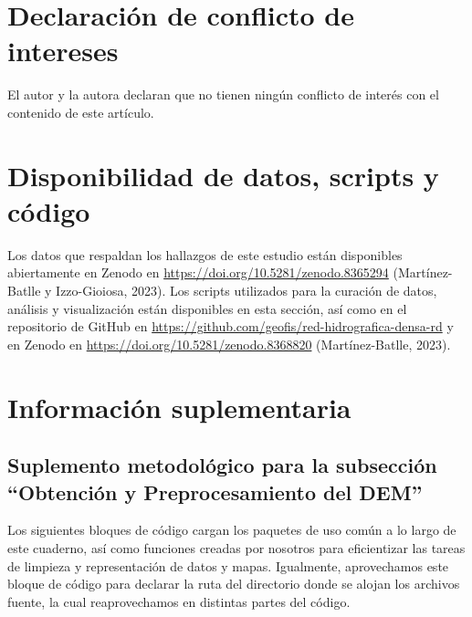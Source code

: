 \documentclass[spanish]{article}
\begin{document}
\hypertarget{declaraciuxf3n-de-conflicto-de-intereses}{%
\section*{Declaración de conflicto de
intereses}\label{declaraciuxf3n-de-conflicto-de-intereses}}

El autor y la autora declaran que no tienen ningún conflicto de interés
con el contenido de este artículo.

\hypertarget{disponibilidad-de-datos-scripts-y-cuxf3digo}{%
\section*{Disponibilidad de datos, scripts y
código}\label{disponibilidad-de-datos-scripts-y-cuxf3digo}}

Los datos que respaldan los hallazgos de este estudio están disponibles
abiertamente en Zenodo en \url{https://doi.org/10.5281/zenodo.8365294}
(Martínez-Batlle y Izzo-Gioiosa, 2023). Los scripts utilizados para la
curación de datos, análisis y visualización están disponibles en esta
sección, así como en el repositorio de GitHub en
\url{https://github.com/geofis/red-hidrografica-densa-rd} y en Zenodo en
\url{https://doi.org/10.5281/zenodo.8368820} (Martínez-Batlle, 2023).

\newpage

\hypertarget{infosupl}{%
\section*{Información suplementaria}\label{infosupl}}

\beginsupplement

\hypertarget{suplemento-metodoluxf3gico-para-la-subsecciuxf3n-obtenciuxf3n-y-preprocesamiento-del-dem}{%
\subsection*{Suplemento metodológico para la subsección ``Obtención y
Preprocesamiento del
DEM''}\label{suplemento-metodoluxf3gico-para-la-subsecciuxf3n-obtenciuxf3n-y-preprocesamiento-del-dem}}

Los siguientes bloques de código cargan los paquetes de uso común a lo
largo de este cuaderno, así como funciones creadas por nosotros para
eficientizar las tareas de limpieza y representación de datos y mapas.
Igualmente, aprovechamos este bloque de código para declarar la ruta del
directorio donde se alojan los archivos fuente, la cual reaprovechamos
en distintas partes del código.
\end{document}
